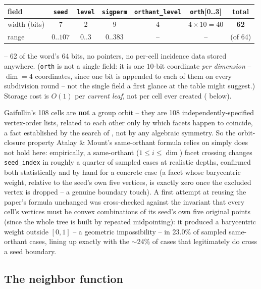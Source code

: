 \documentclass[11pt]{article}
\begin{document}
\begin{center}
\begin{tabular}{@{}lcccccc@{}}
\toprule
field & \texttt{seed} & \texttt{level} & \texttt{sigperm} & \texttt{orthant\_level} & \texttt{orth}[0..3] & total \\
\midrule
width (bits) & 7 & 2 & 9 & 4 & $4\times10=40$ & \textbf{62} \\
range & $0..107$ & $0..3$ & $0..383$ & -- & -- & (of 64) \\
\bottomrule
\end{tabular}
\end{center}

-- 62 of the word's 64 bits, no pointers, no per-cell incidence data
stored anywhere. (\texttt{orth} is not a single field: it is one
$10$-bit coordinate \emph{per dimension} -- $\dim=4$ coordinates, since
one bit is appended to each of them on every subdivision round -- not the
single field a first glance at the table might suggest.) Storage cost is
$O(1)$ per \emph{current leaf}, not per cell ever created
( below).

Gaifullin's 108 cells are \textbf{not} a group orbit -- they are 108
independently-specified vertex-order lists, related to each other only by
which facets happen to coincide, a fact established by the search of
, not by any algebraic symmetry. So the orbit-closure
property Atalay \& Mount's same-orthant formula relies on simply does not
hold here: empirically, a same-orthant ($1\le i\le\dim$) facet crossing
changes \texttt{seed\_index} in roughly a quarter of sampled cases at
realistic depths, confirmed both statistically and by hand for a concrete
case (a facet whose barycentric weight, relative to the seed's own five
vertices, is exactly zero once the excluded vertex is dropped -- a genuine
boundary touch). A first attempt at reusing the paper's formula unchanged
was cross-checked against the invariant that every cell's vertices must be
convex combinations of its seed's own five original points (since the
whole tree is built by repeated midpointing): it produced a barycentric
weight outside $[0,1]$ -- a geometric impossibility -- in 23.0\% of sampled
same-orthant cases, lining up exactly with the $\sim$24\% of cases that
legitimately do cross a seed boundary.

\subsection{The neighbor function}
\label{sec:neighbor}
\end{document}
